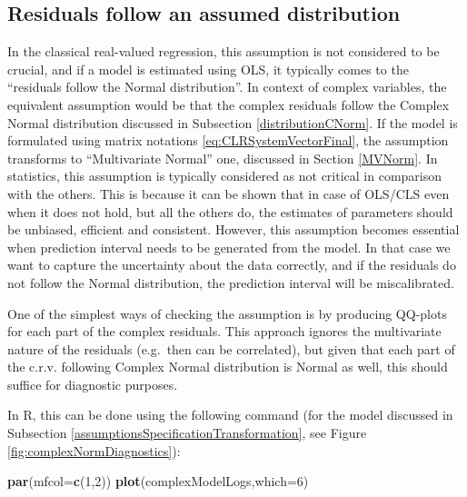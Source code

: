 \documentclass[
]{book}
\newenvironment{Shaded}{\begin{snugshade}}{\end{snugshade}}
\newcommand{\DataTypeTok}[1]{\textcolor[rgb]{0.13,0.29,0.53}{#1}}
\newcommand{\DecValTok}[1]{\textcolor[rgb]{0.00,0.00,0.81}{#1}}
\newcommand{\KeywordTok}[1]{\textcolor[rgb]{0.13,0.29,0.53}{\textbf{#1}}}
\newcommand{\NormalTok}[1]{#1}
\begin{document}
\hypertarget{residuals-follow-an-assumed-distribution}{%
\subsection{Residuals follow an assumed distribution}\label{residuals-follow-an-assumed-distribution}}

In the classical real-valued regression, this assumption is not considered to be crucial, and if a model is estimated using OLS, it typically comes to the ``residuals follow the Normal distribution''. In context of complex variables, the equivalent assumption would be that the complex residuals follow the Complex Normal distribution discussed in Subsection \ref{distributionCNorm}. If the model is formulated using matrix notations \eqref{eq:CLRSystemVectorFinal}, the assumption transforms to ``Multivariate Normal'' one, discussed in Section \ref{MVNorm}. In statistics, this assumption is typically considered as not critical in comparison with the others. This is because it can be shown that in case of OLS/CLS even when it does not hold, but all the others do, the estimates of parameters should be unbiased, efficient and consistent. However, this assumption becomes essential when prediction interval needs to be generated from the model. In that case we want to capture the uncertainty about the data correctly, and if the residuals do not follow the Normal distribution, the prediction interval will be miscalibrated.

One of the simplest ways of checking the assumption is by producing QQ-plots for each part of the complex residuals. This approach ignores the multivariate nature of the residuals (e.g.~then can be correlated), but given that each part of the c.r.v. following Complex Normal distribution is Normal as well, this should suffice for diagnostic purposes.

In R, this can be done using the following command (for the model discussed in Subsection \ref{assumptionsSpecificationTransformation}, see Figure \ref{fig:complexNormDiagnostics}):

\begin{Shaded}
\begin{Highlighting}[]
\KeywordTok{par}\NormalTok{(}\DataTypeTok{mfcol=}\KeywordTok{c}\NormalTok{(}\DecValTok{1}\NormalTok{,}\DecValTok{2}\NormalTok{))}
\KeywordTok{plot}\NormalTok{(complexModelLogs,}\DataTypeTok{which=}\DecValTok{6}\NormalTok{)}
\end{Highlighting}
\end{Shaded}
\end{document}
